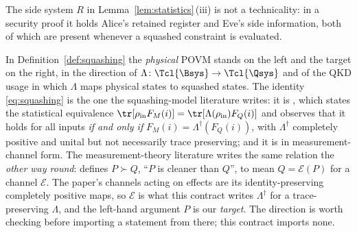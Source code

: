 
The side system $R$ in Lemma~\ref{lem:statistics}\,(iii) is not a
technicality: in a security proof it holds Alice's retained register and Eve's
side information, both of which are present whenever a squashed constraint is
evaluated.

\begin{remark}\label{rem:dictionary}
In Definition~\ref{def:squashing} the \emph{physical} POVM stands on the left
and the target on the right, in the direction of
$\Lambda\colon\Tcl{\Bsys}\to\Tcl{\Qsys}$ and of the QKD usage in which
$\Lambda$ maps physical states to squashed states. The identity
\eqref{eq:squashing} is the one the squashing-model literature writes: it is
\cite[Eqs.~(1)--(2)]{beaudry2008squashing}, which states the statistical
equivalence $\tr[\rho_{\mathrm{in}}F_M(i)]
=\tr[\Lambda(\rho_{\mathrm{in}})F_Q(i)]$ and observes that it holds for all
inputs \emph{if and only if} $F_M(i)=\Lambda^{\dagger}(F_Q(i))$, with
$\Lambda^{\dagger}$ completely positive and unital but not necessarily trace
preserving;
and it is \cite[Eq.~(146)]{tupkary2026decoy} in measurement-channel form.
The measurement-theory literature writes the same relation the \emph{other way
round}: \cite[Def.~6.1]{buscemi2005clean} defines $P\succ Q$, ``$P$ is cleaner
than $Q$'', to mean $Q=\mathcal{E}(P)$ for a channel $\mathcal{E}$. The
paper's channels acting on effects are its identity-preserving completely
positive maps, so $\mathcal{E}$ is what this contract writes
$\Lambda^{\dagger}$ for a trace-preserving $\Lambda$, and the left-hand
argument $P$ is our \emph{target}. The direction is worth checking
before importing a statement from there; this contract imports none.
\end{remark}
